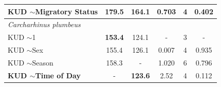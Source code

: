 \documentclass[11pt,a4paper]{article}
\begin{document}
\begin{table}[h!]
\begin{tabular}{@{}lccccc@{}}
			KUD $\sim$Migratory Status     & 179.5 & 164.1 & 0.703 & 4  & 0.402           \\ \midrule
			\textit{Carcharhinus plumbeus} &       &       &       &    &                 \\
			KUD $\sim$1                    & \textbf{153.4} & 124.1 & -     & 3  & -               \\
			KUD $\sim$Sex                  & 155.4 & 126.1 & 0.007 & 4  & 0.935           \\
			KUD $\sim$Season               & 158.3 & -     & 1.020 & 6  & 0.796           \\
			\textbf{KUD $\sim$Time of Day}          & -     & \textbf{123.6} & 2.52  & 4  & 0.112           \\ \bottomrule
		\end{tabular}
		\label{KUD_outputs}
	\end{table}
	
	
	
	\newpage
	
\end{document}
